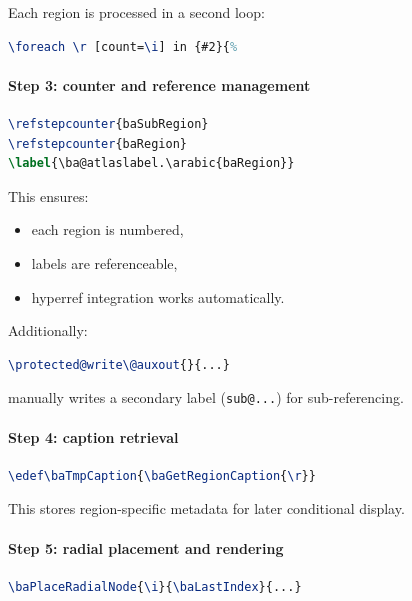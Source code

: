 Each region is processed in a second loop:

\begin{lstlisting}[language=LaTeX]
\foreach \r [count=\i] in {#2}{%
\end{lstlisting}



\paragraph{Step 3: counter and reference management}

\begin{lstlisting}[language=LaTeX]
\refstepcounter{baSubRegion}
\refstepcounter{baRegion}
\label{\ba@atlaslabel.\arabic{baRegion}}
\end{lstlisting}

This ensures:

\begin{itemize}
\item each region is numbered,
\item labels are referenceable,
\item hyperref integration works automatically.
\end{itemize}

Additionally:

\begin{lstlisting}[language=LaTeX]
\protected@write\@auxout{}{...}
\end{lstlisting}

manually writes a secondary label (\texttt{sub@...}) for sub-referencing.



\paragraph{Step 4: caption retrieval}

\begin{lstlisting}[language=LaTeX]
\edef\baTmpCaption{\baGetRegionCaption{\r}}
\end{lstlisting}

This stores region-specific metadata for later conditional display.



\paragraph{Step 5: radial placement and rendering}

\begin{lstlisting}[language=LaTeX]
\baPlaceRadialNode{\i}{\baLastIndex}{...}
\end{lstlisting}

